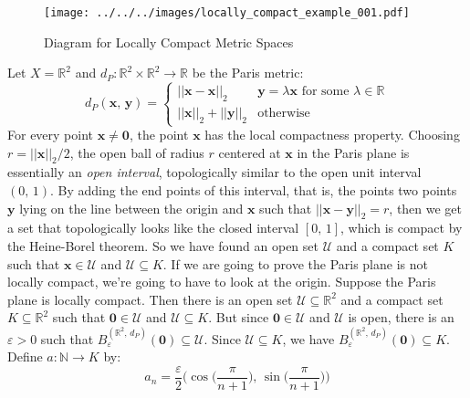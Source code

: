 \documentclass{article}
\theoremstyle{normal}
\begin{document}
    \begin{figure}
        \centering
        \texttt{[image: ../../../images/locally\_compact\_example\_001.pdf]}
        \caption{Diagram for Locally Compact Metric Spaces}
        \label{fig:locally_compact_metric_space_001}
    \end{figure}
    \color{black}
    Let $X=\mathbb{R}^{2}$ and
    $d_{P}:\mathbb{R}^{2}\times\mathbb{R}^{2}\rightarrow\mathbb{R}$
    be the Paris metric:
    \begin{equation}
        d_{P}(\mathbf{x},\,\mathbf{y})=
        \begin{cases}
            ||\mathbf{x}-\mathbf{x}||_{2}&\mathbf{y}=\lambda\mathbf{x}
                \textrm{ for some }\lambda\in\mathbb{R}\\
            ||\mathbf{x}||_{2}+||\mathbf{y}||_{2}&\textrm{otherwise}
        \end{cases}
    \end{equation}
    For every point $\mathbf{x}\ne\mathbf{0}$, the point $\mathbf{x}$ has the
    local compactness property. Choosing $r=||\mathbf{x}||_{2}/2$, the
    open ball of radius $r$ centered at $\mathbf{x}$ in the Paris plane is
    essentially an \textit{open interval}, topologically similar to the open
    unit interval $(0,\,1)$. By adding the end points of this interval,
    that is, the points two points $\mathbf{y}$ lying on the line between the
    origin and $\mathbf{x}$ such that $||\mathbf{x}-\mathbf{y}||_{2}=r$, then
    we get a set that topologically looks like the closed interval
    $[0,\,1]$, which is compact by the Heine-Borel theorem. So we have found
    an open set $\mathcal{U}$ and a compact set $K$ such that
    $\mathbf{x}\in\mathcal{U}$ and $\mathcal{U}\subseteq{K}$. If we are going
    to prove the Paris plane is not locally compact, we're going to have to
    look at the origin. Suppose the Paris plane is locally compact. Then there
    is an open set $\mathcal{U}\subseteq\mathbb{R}^{2}$ and a compact set
    $K\subseteq\mathbb{R}^{2}$ such that $\mathbf{0}\in\mathcal{U}$ and
    $\mathcal{U}\subseteq{K}$. But since $\mathbf{0}\in\mathcal{U}$ and
    $\mathcal{U}$ is open, there is an $\varepsilon>0$ such that
    $B_{\varepsilon}^{(\mathbb{R}^{2},\,d_{P})}(\mathbf{0})\subseteq\mathcal{U}$.
    Since $\mathcal{U}\subseteq{K}$, we have
    $B_{\varepsilon}^{(\mathbb{R}^{2},\,d_{P})}(\mathbf{0})\subseteq{K}$.
    Define $a:\mathbb{N}\rightarrow{K}$ by:
    \begin{equation}
        a_{n}=\frac{\varepsilon}{2}\Big(
            \cos\big(\frac{\pi}{n+1}\big),\,\sin\big(\frac{\pi}{n+1}\big)
        \Big)
    \end{equation}
\end{document}
